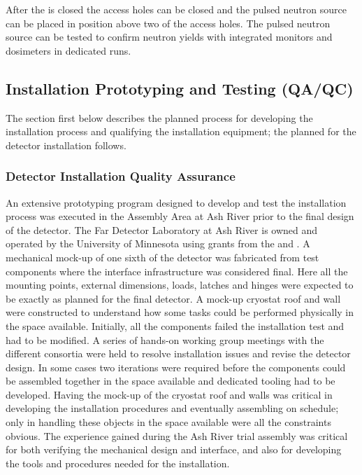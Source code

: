 After the  is closed the access holes  can be closed and the pulsed neutron source can be placed in position above two of the access holes. The pulsed neutron source can be tested to confirm neutron yields with integrated monitors and dosimeters in dedicated runs.





\subsection{Installation Prototyping and Testing (QA/QC)}
\label{sec:fdsp-tc-inst-qaqc}

The section first below describes the planned  process for developing the installation process and qualifying the installation equipment; the  planned for the detector installation follows. %

\subsubsection{Detector Installation Quality Assurance}

An extensive prototyping program designed to develop and test the  installation process was executed in the  Assembly Area at Ash River prior to the final design of the  detector. 
The  Far Detector Laboratory at Ash River is owned and operated by the University of Minnesota using grants from the  and .
A mechanical mock-up of one sixth of the detector was fabricated from test components where the interface infrastructure was considered final. 
Here all the mounting points, external dimensions, loads, latches and hinges were expected to be exactly as planned for the final  detector.
A %
mock-up cryostat roof and wall were constructed to understand how some tasks could  be performed physically in the space available.
Initially, all the components failed the installation test and had to be modified. A series of hands-on working group meetings with the different consortia were held to resolve installation issues and revise the detector design. 
In some cases two iterations were required before the components could be assembled together in the space available and dedicated tooling had to be developed. 
Having the mock-up of the cryostat roof and walls was critical in developing the installation procedures and eventually assembling  on schedule; only in handling these objects  %
in the space available were all the constraints obvious. 
The experience gained during the  Ash River trial assembly was critical for both verifying the mechanical design and interface, and also for developing the tools and procedures needed for the installation.

